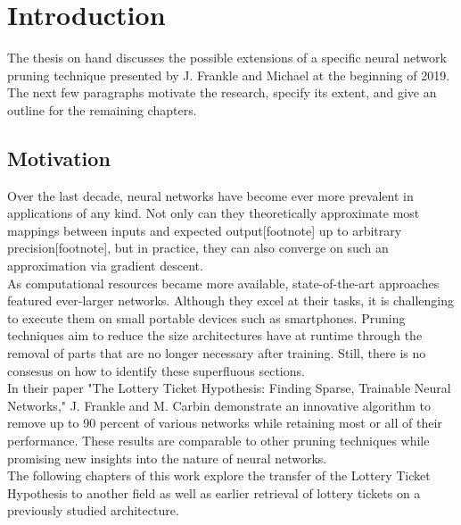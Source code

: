 \chapter{Introduction}
The thesis on hand discusses the possible extensions of a specific neural network pruning technique presented by J. Frankle and Michael at the beginning of 2019.\cite{LTH}\\
The next few paragraphs motivate the research,  specify its extent, and give an outline for the remaining chapters.

\section{Motivation}
Over the last decade, neural networks have become ever more prevalent in applications of any kind. Not only can they theoretically approximate most mappings between inputs and expected output[footnote] up to arbitrary precision[footnote], but in practice, they can also converge on such an approximation via gradient descent.\cite{?}\\ 
As computational resources became more available, state-of-the-art approaches featured ever-larger networks. Although they excel at their tasks, it is challenging to execute them on small portable devices such as smartphones. Pruning techniques aim to reduce the size architectures have at runtime through the removal of parts that are no longer necessary after training. Still, there is no consesus on how to identify these superfluous sections.\\
In their paper "The Lottery Ticket Hypothesis: Finding Sparse, Trainable Neural Networks," J. Frankle and M. Carbin demonstrate an innovative algorithm to remove up to 90 percent of various networks while retaining most or all of their performance. These results are comparable to other pruning techniques while promising new insights into the nature of neural networks.\cite{LTH}
\\
The following chapters of this work explore the transfer of the Lottery Ticket Hypothesis to another field as well as earlier retrieval of lottery tickets on a previously studied architecture.

